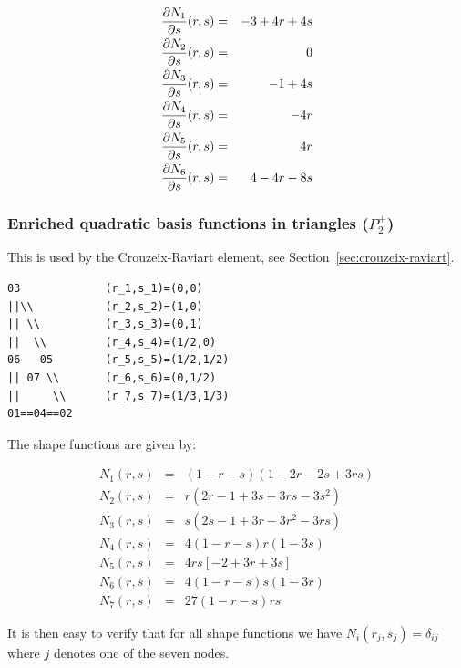 \begin{eqnarray}
\frac{\partial N_1}{\partial s}(r,s) &=&  -3+4r+4s\nonumber\\ 
\frac{\partial N_2}{\partial s}(r,s) &=&  0\nonumber\\ 
\frac{\partial N_3}{\partial s}(r,s) &=&  -1+4s\nonumber\\ 
\frac{\partial N_4}{\partial s}(r,s) &=&  -4r\nonumber\\ 
\frac{\partial N_5}{\partial s}(r,s) &=&  4r\nonumber\\ 
\frac{\partial N_6}{\partial s}(r,s) &=&  4-4r-8s\nonumber
\end{eqnarray}



\subsubsection{Enriched quadratic basis functions in triangles ($P_2^+$)}

This is used by the Crouzeix-Raviart element, see Section~\ref{sec:crouzeix-raviart}. 

\begin{verbatim}
03             (r_1,s_1)=(0,0)
||\\           (r_2,s_2)=(1,0)
|| \\          (r_3,s_3)=(0,1)
||  \\         (r_4,s_4)=(1/2,0)
06   05        (r_5,s_5)=(1/2,1/2)
|| 07 \\       (r_6,s_6)=(0,1/2)
||     \\      (r_7,s_7)=(1/3,1/3)
01==04==02    
\end{verbatim}

The shape functions are given by:

\begin{mdframed}[backgroundcolor=blue!5]
\begin{eqnarray}
N_1(r,s) &=&  (1-r-s)(1-2r-2s+ 3rs) \\
N_2(r,s) &=& r (2 r -1 + 3s-3rs-3s^2 ) \\
N_3(r,s) &=& s (2s -1 + 3r-3r^2-3rs )\\
N_4(r,s) &=& 4(1-r-s)r(1 -3s ) \\
N_5(r,s) &=& 4rs [-2+3r+3s]\\
N_6(r,s) &=& 4(1-r-s)s(1-3r)\\
N_7(r,s) &=& 27 (1-r-s)rs 
\end{eqnarray}
\end{mdframed}
It is then easy to verify that for all shape functions we have 
$N_i(r_j,s_j)=\delta_{ij}$ where $j$ denotes one of the seven nodes. 

